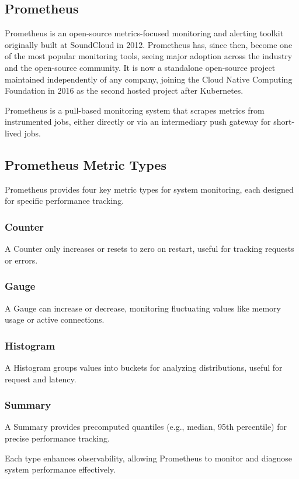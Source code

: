 \documentclass[a4paper,twoside,11pt]{article}
\begin{document}
\subsection{Prometheus}
Prometheus \cite{prometheus:prometheus} is an open-source metrics-focused monitoring and alerting toolkit originally built at SoundCloud in 2012. Prometheus has, since then, become one of the most popular monitoring tools, seeing major adoption across the industry and the open-source community.
It is now a standalone open-source project maintained independently of any company, joining the Cloud Native Computing Foundation in 2016 as the second hosted project after Kubernetes.

Prometheus is a pull-based monitoring system that scrapes metrics from instrumented jobs, either directly or via an intermediary push gateway for short-lived jobs.

\subsection{Prometheus Metric Types}
Prometheus provides four key metric types for system monitoring, each designed for specific performance tracking\cite{metrictypes:prometheus}.

\subsubsection{Counter}
A Counter only increases or resets to zero on restart, useful for tracking requests or errors.

\subsubsection{Gauge}
A Gauge can increase or decrease, monitoring fluctuating values like memory usage or active connections.

\subsubsection{Histogram}
A Histogram groups values into buckets for analyzing distributions, useful for request and latency.

\subsubsection{Summary}
A Summary provides precomputed quantiles (e.g., median, 95th percentile) for precise performance tracking.

Each type enhances observability, allowing Prometheus to monitor and diagnose system performance effectively.
\end{document}
